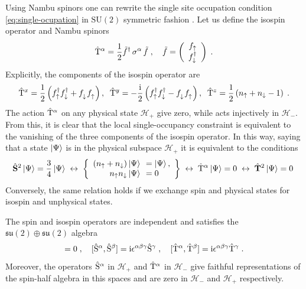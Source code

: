 Using Nambu spinors one can rewrite the single site occupation condition \eqref{eq:single-ocupation} in $\mathrm{SU}(2)$ symmetric fashion \cite{Coleman_1994,Yu_2008}.
Let us define the isospin operator and Nambu spinors
 \begin{equation}
      \hat{\mathrm{T}}^\alpha = \frac{1}{2} \tilde{f}^\dagger \, \sigma^\alpha \, \tilde{f} \; ,  \quad
      \tilde{f} = \left(\begin{array}{c}   f_{\uparrow} \\ f_{\downarrow}^\dagger \end{array}\right) \; .
 \end{equation}
Explicitly, the components of the isospin operator are
\begin{equation}
    \hat{\rmT}^x = \frac{1}{2}\left(
    f_{\uparrow}^\dagger f_{\downarrow}^\dagger
    +f_{\downarrow}^\pd f_{\uparrow}^\pd \right)
    ,\;\;
    \hat{\rmT}^y = -\frac{\im}{2} \left(
    f_{\uparrow}^\dagger f_{\downarrow}^\dagger
    -f_{\downarrow}^\pd f_{\uparrow}^\pd  \right)
    , \;\;
    \hat{\rmT}^z = \frac{1}{2} \left(
    n_\uparrow + n_\downarrow -1 \right)\; .
\end{equation}
The action $\hat{\mathrm{T}}^\alpha$ on any physical state $\mathcal{H}_{+}$ give zero, while acts injectively in $\mathcal{H}_{-}$.
From this, it is clear that the local single-occupancy constraint is equivalent to the vanishing of the three components of the isospin operator.
In this way, saying that a state $\ket{\Psi}$ is in the physical subspace $\mathcal{H}_{+}$ it is equivalent to the conditions
\begin{equation}
    \hat{\mathbf{S}}^2 \ket{\Psi}
    = \frac{3}{4} \ket{\Psi}
    \; \leftrightarrow \;
    \left\{ \begin{array}{rl}
        (n_\uparrow + n_\downarrow)\ket{\Psi} \!\!&=\ket{\Psi}, \\
        n_\uparrow n_\downarrow \ket{\Psi}    \!\!&= 0
    \end{array} \right\}
    \; \leftrightarrow \;   \hat{\mathrm{T}}^\alpha  \ket{\Psi} = 0
    \; \leftrightarrow \;   \hat{\mathbf{T}}^2  \ket{\Psi} = 0 \;
\end{equation}
Conversely, the same relation holds if we exchange spin and physical states for isospin and unphysical states. %

The spin and isospin operators are independent and satisfies the $\mathfrak{su}(2) \oplus \mathfrak{su}(2)$ algebra
\begin{equation}
    [ \hat{\rmS}^\alpha, \hat{\rmT}^\beta]=0 \; ,\quad
    [ \hat{\rmS}^\alpha, \hat{\rmS}^\beta]= \im \epsilon^{\alpha\beta\gamma} \hat{\rmS}^\gamma \; ,\quad
    [ \hat{\rmT}^\alpha, \hat{\rmT}^\beta]= \im \epsilon^{\alpha\beta\gamma} \hat{\rmT}^\gamma \; .
\end{equation}
Moreover, the operators $\hat{\mathrm{S}}^\alpha$ in $\mathcal{H}_{+}$ and  $\hat{\mathrm{T}}^\alpha$ in $\mathcal{H}_{-}$ give faithful representations of the spin-half algebra in this spaces and are zero in $\mathcal{H}_{-}$ and  $\mathcal{H}_{+}$ respectively.




